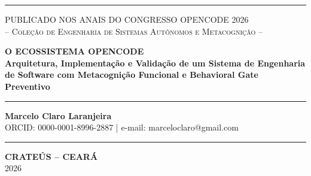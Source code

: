 \documentclass[12pt,a4paper,oneside]{abntex2}
\begin{document}
\begin{capa}
    \centering
    \pagecolor{white}
    \vspace*{1cm}
    
    \noindent
    \color{blue!70!black}\rule{\textwidth}{4pt}\par
    \vspace{1.5cm}
    
    {\large\scshape PUBLICADO NOS ANAIS DO CONGRESSO OPENCODE 2026}\\[0.2cm]
    {\small\scshape -- Coleção de Engenharia de Sistemas Autônomos e Metacognição --}\par
    
    \vspace{2cm}
    
    {\Huge\bfseries\color{blue!70!black} O ECOSSISTEMA OPENCODE}\\[0.5cm]
    {\Large\bfseries\color{gray!80!black} Arquitetura, Implementação e Validação de um Sistema de Engenharia de Software com Metacognição Funcional e Behavioral Gate Preventivo}\\[1cm]
    
    \noindent
    \color{blue!70!black}\rule[0.5ex]{8cm}{1.5pt}\par
    
    \vspace{2.5cm}
    
    {\large\bfseries Marcelo Claro Laranjeira}\\[0.2cm]
    {\small ORCID: 0000-0001-8996-2887 | e-mail: marceloclaro@gmail.com}\par
    
    \vfill
    
    \noindent
    \color{blue!70!black}\rule{\textwidth}{1.5pt}\par
    \vspace{0.4cm}
    {\large\bfseries CRATEÚS -- CEARÁ}\\[0.1cm]
    {\large 2026}\par
    \vspace*{0.5cm}
\end{capa}
\end{document}
